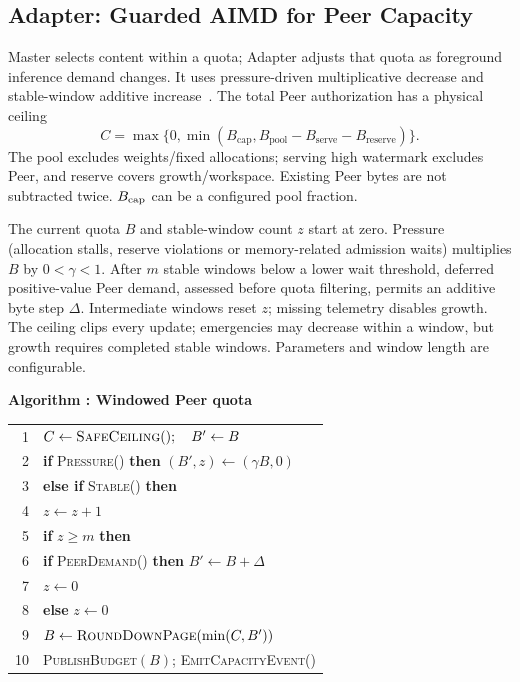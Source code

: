 \subsection{Adapter: Guarded AIMD for Peer Capacity}
\label{sec:adapter}

Master selects content within a quota; Adapter adjusts that quota as
foreground inference demand changes. It uses pressure-driven multiplicative
decrease and stable-window additive increase~\cite{chiu1989aimd}.
The total Peer authorization has a physical ceiling
\begin{equation}
 C=\max\{0,\min(B_{\mathrm{cap}},
 B_{\mathrm{pool}}-B_{\mathrm{serve}}-B_{\mathrm{reserve}})\}.
 \label{eq:peer-ceiling}
\end{equation}
The pool excludes weights/fixed allocations; serving high watermark
excludes Peer, and reserve covers growth/workspace. Existing Peer bytes
are not subtracted twice. $B_{\rm cap}$ can be a configured pool fraction.

The current quota $B$ and stable-window count $z$ start at zero.
Pressure (allocation stalls, reserve violations or
memory-related admission waits) multiplies $B$ by $0<\gamma<1$. After $m$
stable windows below a lower wait threshold, deferred positive-value Peer
demand, assessed before quota filtering, permits an additive byte step
$\Delta$. Intermediate windows reset
$z$; missing telemetry disables growth. The ceiling clips every update;
emergencies may decrease within a window, but growth requires completed
stable windows. Parameters and window length are configurable.

\par\medskip\noindent\begin{minipage}{\columnwidth}
\raggedright
 \label{alg:adapter}
 \textbf{Algorithm \thedesignalgorithm: Windowed Peer quota}
 \par\smallskip
 \begin{tabularx}{\columnwidth}{@{}r@{\quad}X@{}}
 \toprule
 1 & $C\gets\textsc{SafeCeiling}();\quad B'\gets B$ \\
 2 & \textbf{if} \textsc{Pressure}() \textbf{then} $(B',z)\gets(\gamma B,0)$ \\
 3 & \textbf{else if} \textsc{Stable}() \textbf{then} \\
 4 & \quad $z\gets z+1$ \\
 5 & \quad \textbf{if} $z\ge m$ \textbf{then} \\
 6 & \qquad \textbf{if} \textsc{PeerDemand}() \textbf{then} $B'\gets B+\Delta$ \\
 7 & \qquad $z\gets0$ \\
 8 & \textbf{else} $z\gets0$ \\
 9 & $B\gets\textsc{RoundDownPage}(\min(C,B'))$ \\
 10 & \textsc{PublishBudget}$(B)$; \textsc{EmitCapacityEvent}() \\
 \bottomrule
 \end{tabularx}
\end{minipage}\par\medskip

